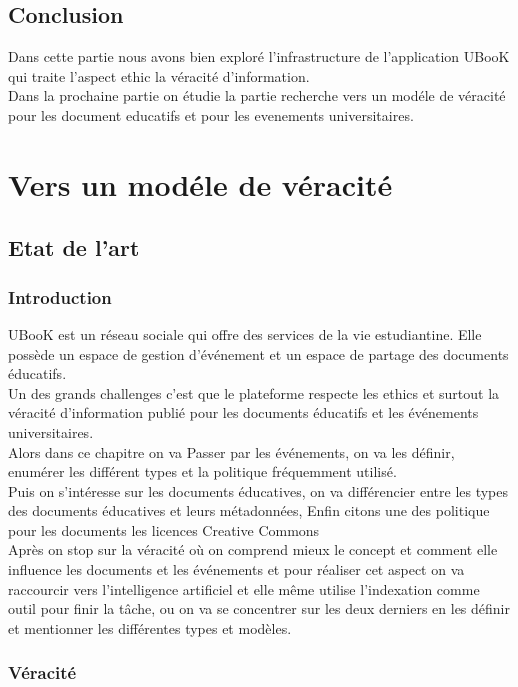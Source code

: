 \documentclass[12pt]{report}
\begin{document}
\chapter*{Conclusion}
Dans cette partie nous avons bien exploré l'infrastructure de l'application UBooK qui traite l'aspect ethic la véracité d'information.\\
Dans la prochaine partie on étudie la partie recherche vers un modéle de véracité pour les document educatifs et pour les evenements universitaires.

\part{Vers un modéle de véracité}



\chapter{Etat de l'art}
\section*{Introduction}

UBooK est un réseau sociale qui offre des services 
de la vie estudiantine. Elle possède un espace de gestion 
d'événement et un espace de partage des documents éducatifs. 
\\Un des grands challenges c'est que le plateforme respecte 
les ethics et surtout la véracité d'information publié pour 
les documents éducatifs et les événements universitaires.
\\Alors dans ce chapitre on va Passer
 par les événements, on va les définir, 
enumérer les différent types et la politique 
fréquemment utilisé. 
\\Puis on s'intéresse sur les documents éducatives, on va différencier entre les types des documents éducatives et leurs métadonnées, Enfin citons une des politique pour les documents les licences Creative Commons 
\\Après on stop sur la véracité où on comprend mieux le
 concept et comment elle influence les documents et les 
événements et pour réaliser cet aspect on va raccourcir vers 
l'intelligence artificiel et elle même utilise l'indexation 
comme outil pour finir la tâche, ou on va se concentrer sur 
les deux derniers en les définir et mentionner les différentes
 types et modèles.
\section{Véracité}
\end{document}

